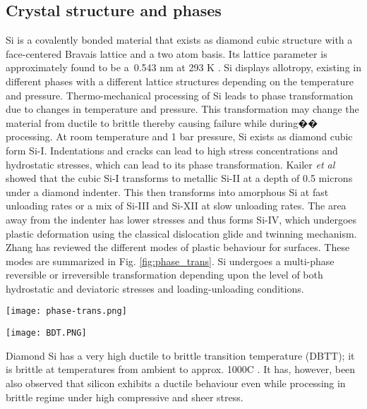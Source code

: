 \subsection{Crystal structure and phases}
Si is a covalently bonded material that exists as diamond cubic structure with a face-centered Bravais lattice and a two atom basis. Its lattice parameter is approximately found to be a~0.543 nm at 293 K \cite{hull1999properties}. Si displays allotropy, existing in different phases with a different lattice structures depending on the temperature and pressure. Thermo-mechanical processing of Si leads to phase transformation due to changes in temperature and pressure. This transformation may change the material from ductile to brittle thereby causing failure while during�� processing. At room temperature and 1 bar pressure, Si exists as diamond cubic form Si-I. Indentations and cracks can lead to high stress concentrations and hydrostatic stresses, which can lead to its phase transformation.  Kailer \textit{et al} \cite{kailer1997phase} showed that the cubic Si-I transforms to metallic Si-II at a depth of 0.5 microns under a diamond indenter. This then transforms into amorphous Si at fast unloading rates or a mix of Si-III and Si-XII at slow unloading rates. The area away from the indenter has lower stresses and thus forms Si-IV, which undergoes plastic deformation using the classical dislocation glide and twinning mechanism. Zhang \cite{zhang2004plasticity} has reviewed the different modes of plastic behaviour for surfaces. These modes are summarized in Fig. \ref{fig:phase_trans}. Si undergoes a multi-phase reversible or irreversible transformation depending upon the level of both hydrostatic and deviatoric stresses and loading-unloading conditions. 

\noindent
\begin{minipage}[c]{\textwidth}
\centering
        \texttt{[image: phase-trans.png]}
        \label{fig:phase_trans}
 \end{minipage}

\noindent
\begin{minipage}[c]{\textwidth}
\centering
        \texttt{[image: BDT.PNG]}
        \label{fig:bdt}
 \end{minipage}

Diamond Si has a very high ductile to brittle transition temperature (DBTT); it is brittle at temperatures from ambient to approx. 1000\degree C \cite{brede1993brittle}. It has, however, been also observed that silicon exhibits a ductile behaviour even while processing in brittle regime \cite{liu2007mechanism} under high compressive and sheer stress.
\newline

